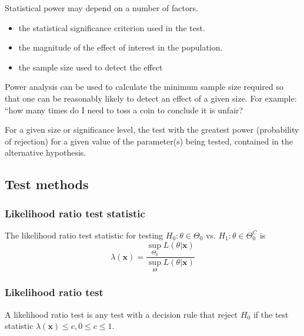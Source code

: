 \begin{refsection}
\begin{remark}
	Statistical power may depend on a number of factors. \begin{itemize}
		\item the statistical significance criterion used in the test.
		\item the magnitude of the effect of interest in the population.
		\item the sample size used to detect the effect
	\end{itemize}
\end{remark}

\begin{remark}
Power analysis can be used to calculate the minimum sample size required so that one can be reasonably likely to detect an effect of a given size. For example: “how many times do I need to toss a coin to conclude it is unfair?	
\end{remark}

\begin{definition}
	For a given size or significance level, the test with the greatest power (probability of rejection) for a given value of the parameter(s) being tested, contained in the alternative hypothesis.	
\end{definition}


\subsection{Test methods}
\subsubsection{Likelihood ratio test statistic}
\begin{definition}
	The likelihood ratio test statistic for testing $H_0:\theta \in \Theta_0$ vs. $H_1:\theta \in \Theta_0^C$ is
	\begin{equation}
	\lambda(\bm{x}) = \frac{\sup_{\Theta_0} L(\theta|\bm{x})}{\sup_{\Theta} L(\theta|\bm{x})}
	\end{equation}
\end{definition}


\subsubsection{Likelihood ratio test}
\begin{definition}
	A likelihood ratio test is any test with a decision rule that reject $H_0$ if the test statistic $\lambda(\bm{x}) \leq c, 0\leq c \leq 1$.
\end{definition}




\end{refsection}
